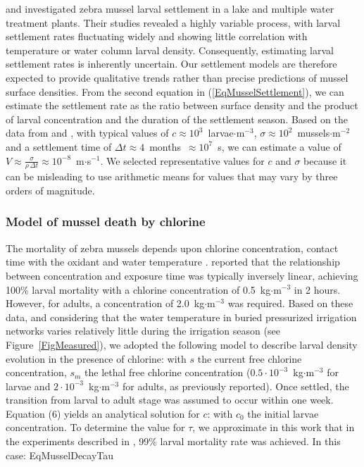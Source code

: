 \documentclass[review,authoryear]{elsarticle}
\begin{document}
\citet{Alix16} and \citet{AlonzoMoya21} investigated zebra mussel larval
settlement in a lake and multiple water treatment plants. Their studies revealed
a highly variable process, with larval settlement rates fluctuating widely and
showing little correlation with temperature or water column larval density.
Consequently, estimating larval settlement rates is inherently uncertain. Our
settlement models are therefore expected to provide qualitative trends rather
than precise predictions of mussel surface densities. From the second equation
in (\ref{EqMusselSettlement}), we can estimate the settlement rate as the ratio
between surface density and the product of larval concentration and the duration
of the settlement season. Based on the data from \citet{Alix16} and
\citet{AlonzoMoya21}, with typical values of 
$c\approx 10^3$~larvae$\cdot$m$^{-3}$,
$\sigma\approx 10^2$~mussels$\cdot$m$^{-2}$ and a settlement time of
$\Delta t\approx4$~months~$\approx10^7$~s, we can estimate a value of
$V\approx\frac{\sigma}{\rho\,\Delta t}\approx10^{-8}$~m$\cdot$s$^{-1}$. We
selected representative values for $c$ and $\sigma$ because it can be misleading
to use arithmetic means for values that may vary by three orders of magnitude.

\subsubsection{Model of mussel death by chlorine\label{SecMusselDeath}}

The mortality of zebra mussels depends upon chlorine concentration, contact time
with the oxidant and water temperature \citep{vanBenschoten95}.
\citet{SprecherGetsinger00} reported that the relationship between concentration
and exposure time was typically inversely linear, achieving 100\% larval
mortality with a chlorine concentration of 0.5~kg$\cdot$m$^{-3}$ in 2 hours.
However, for adults, a concentration of 2.0~kg$\cdot$m$^{-3}$ was required.
Based on these data, and considering that the water temperature in buried
pressurized irrigation networks varies relatively little during the irrigation
season (see Figure~\ref{FigMeasured}), we adopted the following model to
describe larval density evolution in the presence of chlorine:
with $s$ the current free chlorine concentration, $s_m$ the lethal free
chlorine concentration ($0.5\cdot10^{-3}$~kg$\cdot$m$^{-3}$ for larvae and
$2\cdot10^{-3}$~kg$\cdot$m$^{-3}$ for adults, as previously reported).
Once settled, the transition from larval to adult stage was assumed to occur
within one week. Equation (6) yields an analytical solution for $c$:
with $c_0$ the initial larvae concentration. To determine the value for $\tau$,
we approximate in this work that in the experiments described in
\cite{SprecherGetsinger00}, 99\% larval mortality rate was achieved. In this
case:
{EqMusselDecayTau}
\end{document}
